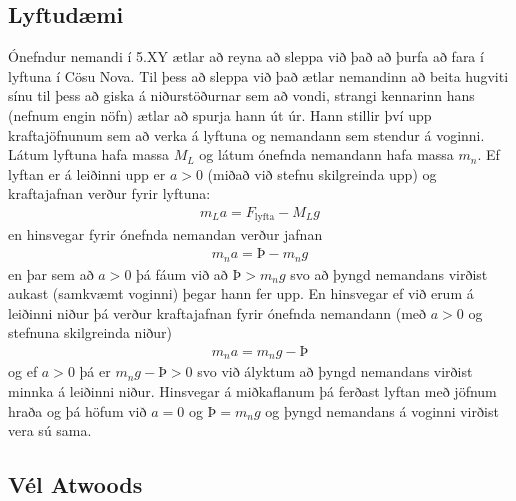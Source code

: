 \ifdefined \wholebook \else\documentclass[oneside]{book}\usepackage{EdlBook}\graphicspath{{figures/}}
\begin{document}
\subsection*{Lyftudæmi}

Ónefndur nemandi í 5.XY ætlar að reyna að sleppa við það að þurfa að fara í lyftuna í Cösu Nova. Til þess að sleppa við það ætlar nemandinn að beita hugviti sínu til þess að giska á niðurstöðurnar sem að vondi, strangi kennarinn hans (nefnum engin nöfn) ætlar að spurja hann út úr. Hann stillir því upp kraftajöfnunum sem að verka á lyftuna og nemandann sem stendur á voginni. Látum lyftuna hafa massa $M_L$ og látum ónefnda nemandann hafa massa $m_n$. Ef lyftan er á leiðinni upp er $a > 0$ (miðað við stefnu skilgreinda upp) og kraftajafnan verður fyrir lyftuna:
\begin{align*}
    m_L a = F_{\text{lyfta}} - M_L g
\end{align*}
en hinsvegar fyrir ónefnda nemandan verður jafnan
\begin{align*}
    m_n a = Þ - m_n g
\end{align*}
en þar sem að $a > 0$ þá fáum við að $Þ > m_n g$ svo að þyngd nemandans virðist aukast (samkvæmt voginni) þegar hann fer upp. En hinsvegar ef við erum á leiðinni niður þá verður kraftajafnan fyrir ónefnda nemandann (með $a > 0$ og stefnuna skilgreinda niður)
\begin{align*}
    m_n a = m_n g - Þ
\end{align*}
og ef $a > 0$ þá er $m_ng - Þ > 0$ svo við ályktum að þyngd nemandans virðist minnka á leiðinni niður. Hinsvegar á miðkaflanum þá ferðast lyftan með jöfnum hraða og þá höfum við $a = 0$ og $Þ = m_ng$ og þyngd nemandans á voginni virðist vera sú sama.

\newpage

\subsection*{Vél Atwoods}
\end{document}
